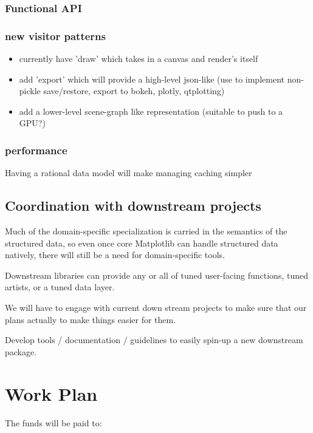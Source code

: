 \documentclass[11pt]{article}  %
\begin{document}
\subsubsection{Functional API}



\subsubsection{new visitor patterns}

\begin{itemize}
\item currently have 'draw' which takes in a canvas and render's itself
\item add 'export' which will provide a high-level json-like (use to
  implement non-pickle save/restore, export to {bokeh, plotly,
    qtplotting})
\item add a lower-level scene-graph like representation (suitable to push to a GPU?)
\end{itemize}

\subsubsection{performance}
Having a rational data model will make managing caching simpler

\subsection{Coordination with downstream projects}

Much of the domain-specific specialization is carried in the semantics
of the structured data, so even once core Matplotlib can handle structured
data natively, there will still be a need for domain-specific tools.

Downstream libraries can provide any or all of tuned user-facing
functions, tuned artists, or a tuned data layer.

We will have to engage with current down stream projects to make sure
that our plans actually to make things easier for them.

Develop tools / documentation / guidelines to easily spin-up a new
downstream package.


\section{Work Plan}

The funds will be paid to:
\end{document}
